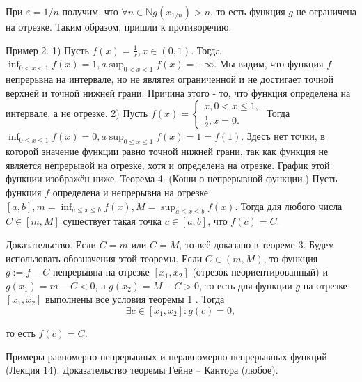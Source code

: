 При $\varepsilon=1 / n$ получим, что $\forall n \in \mathbb{N} g\left(x_{1 / n}\right)>n$, то есть функция $g$ не ограничена на отрезке. Таким образом, пришли к противоречию.

Пример 2. 1) Пусть $f(x)=\frac{1}{x}, x \in(0,1)$. Тогдa $\inf _{0<x<1} f(x)=1, a \sup _{0<x<1} f(x)=+\infty$. Мы видим, что функция $f$ непрерьвна на интервале, но не являтея ограниченной и не достигает точной верхней и точной нижней грани. Причина этого - то, что функция определена на интервале, а не отрезке.
2) Пусть $f(x)=\left\{\begin{array}{l}x, 0<x \leq 1, \\ \frac{1}{2}, x=0 .\end{array}\right.$ Тогда $\inf _{0 \leq x \leq 1} f(x)=0, a \sup _{0 \leq x \leq 1} f(x)=1=f(1)$. Здесъ нет точки, в которой значение функции равно точной нижней грани, так как функция не является непрерывой на отрезке, хотя и определена на отрезке. График этой функции изображён ниже.
Теорема 4. (Коши о непрерывной функции.) Пусть функция $f$ определена и непрерывна на отрезке $[a, b], m=\inf _{a \leq x \leq b} f(x), M=\sup _{a \leq x \leq b} f(x)$. Тогда для любого числа $C \in[m, M]$ существует такая точка $c \in[a, b]$, что $f(c)=C$.

Доказательство. Если $C=m$ или $C=M$, то всё доказано в теореме 3. Будем использовать обозначения этой теоремы. Если $C \in(m, M)$, то функция $g:=f-C$ непрерывна на отрезке $\left[x_1, x_2\right]$ (отрезок неориентированный) и $g\left(x_1\right)=m-C<0$, а $g\left(x_2\right)=M-C>0$, то есть для функции $g$ на отрезке $\left[x_1, x_2\right]$ выполнены все условия теоремы 1 . Тогда
$$
\exists c \in\left[x_1, x_2\right]: g(c)=0,
$$

то есть $f(c)=C$.
\newpage

\begin{problem}
Примеры равномерно непрерывных и неравномерно непрерывных функций (Лекция
14). Доказательство теоремы Гейне – Кантора (любое).
\end{problem}

